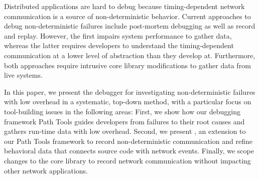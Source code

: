 Distributed applications are hard to debug because timing-dependent
network communication is a source of non-deterministic behavior.
%
%
%
Current approaches to debug non-deterministic failures include
post-mortem debugging as well as record and replay.
%
However, the first impairs system performance to gather data, whereas
the latter requires developers to understand the timing-dependent
communication at a lower level of abstraction than they develop
at. Furthermore, both approaches require intrusive core library
modifications to gather data from live systems.
%

In this paper, we present the \toolname debugger for investigating
non-deterministic failures with low overhead in a systematic, top-down
method, with a particular focus on tool-building issues in the
following areas: 
%
First, we show how our debugging framework Path Tools guides developers from
failures to their root causes and gathers run-time data with low overhead.
%
Second, we present \toolname, an extension to our Path Tools framework to record
non-deterministic communication and refine behavioral data that connects source
code with network events.
%
Finally, we scope changes to the core library to record network communication
without impacting other network applications.

